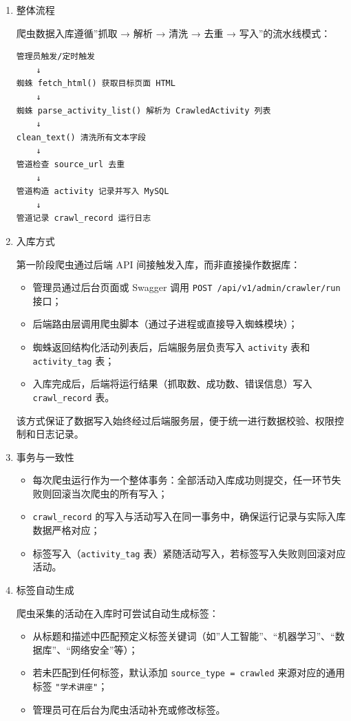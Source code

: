 \documentclass[UTF8,a4paper,12pt,fontset=none]{ctexrep}
\providecommand{\tightlist}{}
\begin{document}
\begin{enumerate}
\def\labelenumi{\arabic{enumi}.}
\item
  整体流程

  爬虫数据入库遵循''抓取 → 解析 → 清洗 → 去重 → 写入''的流水线模式：

\begin{verbatim}
管理员触发/定时触发
    ↓
蜘蛛 fetch_html() 获取目标页面 HTML
    ↓
蜘蛛 parse_activity_list() 解析为 CrawledActivity 列表
    ↓
clean_text() 清洗所有文本字段
    ↓
管道检查 source_url 去重
    ↓
管道构造 activity 记录并写入 MySQL
    ↓
管道记录 crawl_record 运行日志
\end{verbatim}
\item
  入库方式

  第一阶段爬虫通过后端 API 间接触发入库，而非直接操作数据库：

  \begin{itemize}
  \tightlist
  \item
    管理员通过后台页面或 Swagger 调用 \texttt{POST\ /api/v1/admin/crawler/run} 接口；
  \item
    后端路由层调用爬虫脚本（通过子进程或直接导入蜘蛛模块）；
  \item
    蜘蛛返回结构化活动列表后，后端服务层负责写入
    \texttt{activity} 表和 \texttt{activity\_tag} 表；
  \item
    入库完成后，后端将运行结果（抓取数、成功数、错误信息）写入 \texttt{crawl\_record} 表。
  \end{itemize}

  该方式保证了数据写入始终经过后端服务层，便于统一进行数据校验、权限控制和日志记录。
\item
  事务与一致性

  \begin{itemize}
  \tightlist
  \item
    每次爬虫运行作为一个整体事务：全部活动入库成功则提交，任一环节失败则回滚当次爬虫的所有写入；
  \item
    \texttt{crawl\_record} 的写入与活动写入在同一事务中，确保运行记录与实际入库数据严格对应；
  \item
    标签写入（\texttt{activity\_tag} 表）紧随活动写入，若标签写入失败则回滚对应活动。
  \end{itemize}
\item
  标签自动生成

  爬虫采集的活动在入库时可尝试自动生成标签：

  \begin{itemize}
  \tightlist
  \item
    从标题和描述中匹配预定义标签关键词（如''人工智能''、``机器学习''、``数据库''、``网络安全''等）；
  \item
    若未匹配到任何标签，默认添加 \texttt{source\_type\ =\ \textquotesingle{}crawled\textquotesingle{}} 来源对应的通用标签 \texttt{"学术讲座"}；
  \item
    管理员可在后台为爬虫活动补充或修改标签。
  \end{itemize}
\end{enumerate}
\end{document}
